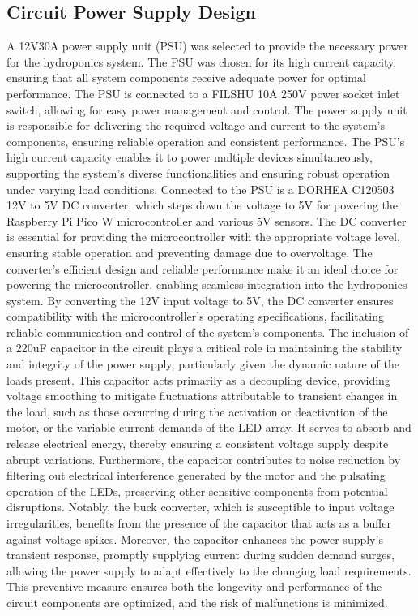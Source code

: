 \documentclass[12pt]{article} %
\begin{document}
\subsection{Circuit Power Supply Design}
\noindent A 12V30A power supply unit (PSU) was selected to provide the necessary power for the hydroponics system. The PSU was chosen for its high current capacity, ensuring that all system components receive adequate power for optimal performance. The PSU is connected to a FILSHU 10A 250V power socket inlet switch, allowing for easy power management and control. The power supply unit is responsible for delivering the required voltage and current to the system's components, ensuring reliable operation and consistent performance. The PSU's high current capacity enables it to power multiple devices simultaneously, supporting the system's diverse functionalities and ensuring robust operation under varying load conditions.
\newline
\newline
\noindent Connected to the PSU is a DORHEA C120503 12V to 5V DC converter, which steps down the voltage to 5V for powering the Raspberry Pi Pico W microcontroller and various 5V sensors. The DC converter is essential for providing the microcontroller with the appropriate voltage level, ensuring stable operation and preventing damage due to overvoltage. The converter's efficient design and reliable performance make it an ideal choice for powering the microcontroller, enabling seamless integration into the hydroponics system. By converting the 12V input voltage to 5V, the DC converter ensures compatibility with the microcontroller's operating specifications, facilitating reliable communication and control of the system's components.
\newline
\newline
\noindent The inclusion of a 220uF capacitor \cite{ref_capacitor} in the circuit plays a critical role in maintaining the stability and integrity of the power supply, particularly given the dynamic nature of the loads present. This capacitor acts primarily as a decoupling device, providing voltage smoothing to mitigate fluctuations attributable to transient changes in the load, such as those occurring during the activation or deactivation of the motor, or the variable current demands of the LED array. It serves to absorb and release electrical energy, thereby ensuring a consistent voltage supply despite abrupt variations. Furthermore, the capacitor contributes to noise reduction by filtering out electrical interference generated by the motor and the pulsating operation of the LEDs, preserving other sensitive components from potential disruptions. Notably, the buck converter, which is susceptible to input voltage irregularities, benefits from the presence of the capacitor that acts as a buffer against voltage spikes. Moreover, the capacitor enhances the power supply's transient response, promptly supplying current during sudden demand surges, allowing the power supply to adapt effectively to the changing load requirements. This preventive measure ensures both the longevity and performance of the circuit components are optimized, and the risk of malfunctions is minimized.
\end{document}
